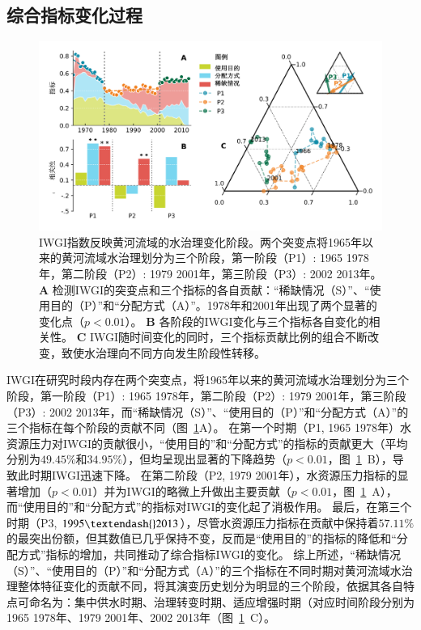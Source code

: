 \subsection{综合指标变化过程}\label{ch4:sec:process}

\begin{figure}[ht!]
	\centering
	\includegraphics[width=\textwidth]{img/ch4/ch4_index.png}
	\caption[IWGI指数反映黄河流域的水治理变化阶段]{IWGI指数反映黄河流域的水治理变化阶段。两个突变点将1965年以来的黄河流域水治理划分为三个阶段，第一阶段（P1）: 1965 \textendash{} 1978年，第二阶段（P2）: 1979 \textendash{} 2001年，第三阶段（P3）: 2002 \textendash{} 2013年。
	\textbf{A} 检测IWGI的突变点和三个指标的各自贡献：“稀缺情况（S）”、“使用目的（P）”和“分配方式（A）”。1978年和2001年出现了两个显著的变化点（$p<0.01$）。
	\textbf{B}  各阶段的IWGI变化与三个指标各自变化的相关性。
	\textbf{C} IWGI随时间变化的同时，三个指标贡献比例的组合不断改变，致使水治理向不同方向发生阶段性转移。
	}\label{ch4:fig:IWGI}
\end{figure}

IWGI在研究时段内存在两个突变点，将1965年以来的黄河流域水治理划分为三个阶段，第一阶段（P1）: 1965 \textendash{} 1978年，第二阶段（P2）: 1979 \textendash{} 2001年，第三阶段（P3）: 2002 \textendash{} 2013年，而“稀缺情况（S）”、“使用目的（P）”和“分配方式（A）”的三个指标在每个阶段的贡献不同（图~\ref{ch4:fig:IWGI}A）。
在第一个时期（P1, 1965 \textendash{} 1978年）水资源压力对IWGI的贡献很小，“使用目的”和“分配方式”的指标的贡献更大（平均分别为$49.45\%$和$34.95\%$），但均呈现出显著的下降趋势（$p<0.01$，图~\ref{ch4:fig:IWGI}~B），导致此时期IWGI迅速下降。
在第二阶段（P2, 1979 \textendash{} 2001年），水资源压力指标的显著增加（$p<0.01$）并为IWGI的略微上升做出主要贡献（$p<0.01$，图~\ref{ch4:fig:IWGI}~A），而“使用目的”和“分配方式”的指标对IWGI的变化起了消极作用。
最后，在第三个时期（P3, $1995 \textendash{} 2013$），尽管水资源压力指标在贡献中保持着$57.11\%$的最突出份额，但其数值已几乎保持不变，反而是“使用目的”的指标的降低和“分配方式”指标的增加，共同推动了综合指标IWGI的变化。
综上所述，“稀缺情况（S）”、“使用目的（P）”和“分配方式（A）”的三个指标在不同时期对黄河流域水治理整体特征变化的贡献不同，将其演变历史划分为明显的三个阶段，依据其各自特点可命名为：集中供水时期、治理转变时期、适应增强时期（对应时间阶段分别为1965 \textendash{} 1978年、1979 \textendash{} 2001年、2002 \textendash{} 2013年（图~\ref{ch4:fig:IWGI}~C）。

